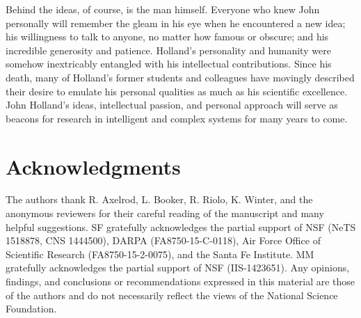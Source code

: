 \documentclass{sig-alternate}
\begin{document}
Behind the ideas, of course, is the man himself.   Everyone who knew
John personally will remember the gleam in his eye when he
encountered a new idea; his willingness to talk to anyone, no matter
how famous or obscure; and his incredible generosity and patience.
Holland's personality and humanity were somehow inextricably entangled
with his intellectual contributions.  Since his death, many of
Holland's former students and colleagues have movingly described their
desire to emulate his personal qualities as much as his scientific
excellence.  John Holland's ideas, intellectual passion, and personal approach will serve as
beacons for research in intelligent and complex systems for many
years to come. 



\section{Acknowledgments}

The authors thank R. Axelrod, L. Booker, R. Riolo, K. Winter, and the
anonymous reviewers for their careful reading of the manuscript and
many helpful suggestions.  SF gratefully acknowledges the partial
support of NSF (NeTS 1518878, CNS 1444500), DARPA (FA8750-15-C-0118),
Air Force Office of Scientific Research (FA8750-15-2-0075), and the
Santa Fe Institute.  MM gratefully acknowledges the partial support of
NSF (IIS-1423651).  Any opinions, findings, and conclusions or
recommendations expressed in this material are those of the authors
and do not necessarily reflect the views of the National Science
Foundation.




\end{document}
